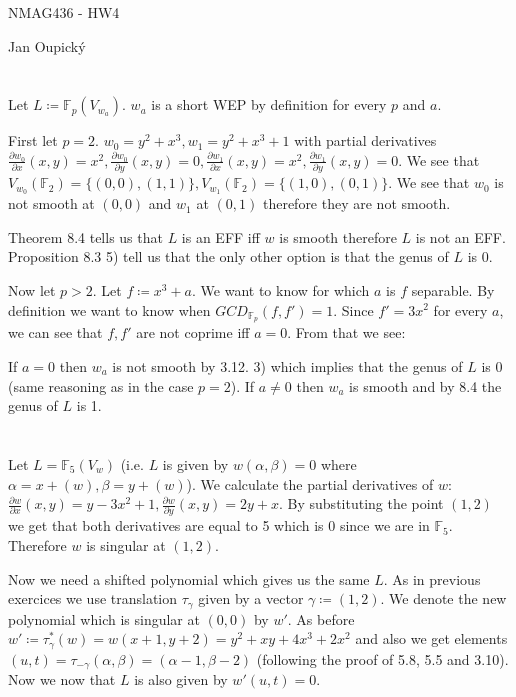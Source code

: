 \documentclass[12pt, a4paper]{article}
\begin{document}
\begin{center}
\large NMAG436 - HW4

\normalsize Jan Oupický
\end{center}
\vspace{1\baselineskip}

\section{}
Let $L \coloneqq \mathbb{F}_p(V_{w_a})$. $w_a$ is a short WEP by definition for every $p$ and $a$. 

First let $p=2$. $w_0 = y^2+x^3, w_1 = y^2 + x^3 + 1$ with partial derivatives $\frac{\partial w_0}{\partial x} (x,y) = x^2, \frac{\partial w_0}{\partial y} (x,y) = 0, \frac{\partial w_1}{\partial x} (x,y) = x^2, \frac{\partial w_1}{\partial y} (x,y) = 0$. We see that $V_{w_0}(\mathbb{F}_2) = \{(0,0), (1,1)\}, V_{w_1}(\mathbb{F}_2) = \{(1,0),(0,1)\}$. We see that $w_0$ is not smooth at $(0,0)$ and $w_1$ at $(0,1)$ therefore they are not smooth. 

Theorem 8.4 tells us that $L$ is an EFF iff $w$ is smooth therefore $L$ is not an EFF. Proposition 8.3 5) tell us that the only other option is that the genus of $L$ is 0.

Now let $p>2$. Let $f \coloneqq x^3+a$. We want to know for which $a$ is $f$ separable. By definition we want to know when $GCD_{\mathbb{F}_p}(f,f')=1$. Since $f' = 3x^2$ for every $a$, we can see that $f,f'$ are not coprime iff $a = 0$. From that we see:


If $a=0$ then $w_a$ is not smooth by 3.12. 3) which implies that the genus of $L$ is 0 (same reasoning as in the case $p=2$). If $a\neq 0$ then $w_a$ is smooth and by 8.4 the genus of $L$ is 1. 

\section{}
Let $L=\mathbb{F}_5(V_w)$ (i.e. $L$ is given by $w(\alpha,\beta)=0$ where $\alpha = x + (w), \beta = y + (w)$). We calculate the partial derivatives of $w$: $\frac{\partial w}{\partial x}(x,y)=y-3x^2+1, \frac{\partial w}{\partial y}(x,y) = 2y+x$. By substituting the point $(1,2)$ we get that both derivatives are equal to 5 which is 0 since we are in $\mathbb{F}_5$. Therefore $w$ is singular at $(1,2)$.

Now we need a shifted polynomial which gives us the same $L$. As in previous exercices we use translation $\tau_\gamma$ given by a vector $\gamma \coloneqq (1,2)$. We denote the new polynomial which is singular at $(0,0)$ by $w'$. As before $w' \coloneqq \tau_{\gamma}^*(w) = w(x+1,y+2) = y^2+xy+4x^3+2x^2$ and also we get elements $(u,t) = \tau_{-\gamma}(\alpha,\beta) = (\alpha-1,\beta-2)$ (following the proof of 5.8, 5.5 and 3.10). Now we now that $L$ is also given by $w'(u,t)=0$.
\end{document}
